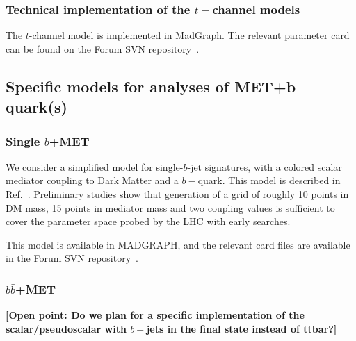 \documentclass[debug,notitlepage]{dmfm}
\newif\ifATLAS
\newif\ifCMS
\begin{document}
\ifCMS
\textbf{[Open point: Add here implementation details for CMS..]}
\fi

\subsubsection{Technical implementation of the $t-$channel models} 

The $t$-channel model is implemented in MadGraph. 
The relevant parameter card can be found on the Forum
SVN repository~\cite{ForumSVN_TChannel}. 


\ifATLAS
\textbf{[Open point: Add here implementation details for ATLAS.]}
\fi

\ifCMS
\textbf{[Open point: Add here implementation details for CMS..]}
\fi

\subsection{Specific models for analyses of MET+b quark(s)}

\subsubsection{Single $b$+MET}

We consider a simplified model for single-$b$-jet signatures, 
with a colored scalar mediator coupling to Dark Matter and a $b-$quark. 
This model is described in Ref.~\cite{Agrawal:2014una}. Preliminary studies 
show that generation of a grid of roughly 10 points in DM mass, 15 points in mediator
mass and two coupling values is sufficient to cover the parameter
space probed by the LHC with early searches. 

This model is available in MADGRAPH, and the relevant card files are 
available in the Forum SVN repository~\cite{ForumSVN_DMSingleB}.

\subsubsection{$b \bar{b}$+MET}

\textbf{[Open point: Do we plan for a specific implementation of the scalar/pseudoscalar
with $b-$jets in the final state instead of ttbar?]}
\end{document}
